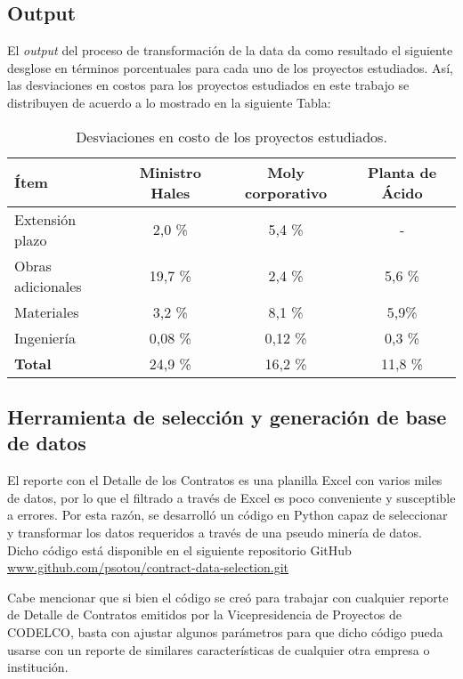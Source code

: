 \subsection{Output}

El \emph{output} del proceso de transformación de la data da como resultado el siguiente desglose en términos porcentuales para cada uno de los proyectos estudiados. Así, las desviaciones en costos para los proyectos estudiados en este trabajo se distribuyen de acuerdo a lo mostrado en la siguiente Tabla:

\begin{table}[H]
    \centering
    \label{tab.datos_desv_proy}
    \caption{Desviaciones en costo de los proyectos estudiados.}
    \begin{tabular}{lccc}
        \toprule 
        Ítem              & Ministro Hales & Moly corporativo & Planta de Ácido \\
        \midrule
        Extensión plazo   & 2,0 \%         & 5,4 \%           & -       \\
        Obras adicionales & 19,7 \%        & 2,4 \%           & 5,6 \%  \\
        Materiales        & 3,2 \%         & 8,1 \%           & 5,9\%   \\       
        Ingeniería        & 0,08 \%        & 0,12 \%          & 0,3 \%  \\
        \textbf{Total}    & 24,9 \%        & 16,2 \%          & 11,8 \% \\
        \bottomrule
    \end{tabular}
\end{table}

\subsection{Herramienta de selección y generación de base de datos}

El reporte con el Detalle de los Contratos es una planilla Excel con varios miles de datos, por lo que el filtrado a través de Excel es poco conveniente y susceptible a errores. Por esta razón, se desarrolló un código en Python capaz de seleccionar y transformar los datos requeridos a través de una pseudo minería de datos. Dicho código está disponible en el siguiente repositorio GitHub \url{www.github.com/psotou/contract-data-selection.git}

Cabe mencionar que si bien el código se creó para trabajar con cualquier reporte de Detalle de Contratos emitidos por la Vicepresidencia de Proyectos de CODELCO, basta con ajustar algunos parámetros para que dicho código pueda usarse con un reporte de similares características de cualquier otra empresa o institución.


